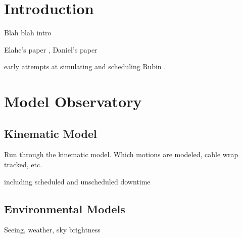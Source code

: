 \documentclass[]{aastex631}
\begin{document}

\section{Introduction} \label{sec:intro}
Blah blah intro

Elahe's paper \citet{Naghib2019}, Daniel's paper \citep{Rothchild2019}

early attempts at simulating and scheduling Rubin \citet{Delgado2014, Delgado2016SPIE}.


\section{Model Observatory}\label{sec:model_obs}

\subsection{Kinematic Model}

Run through the kinematic model. Which motions are modeled, cable wrap tracked, etc.

including scheduled and unscheduled downtime


\subsection{Environmental Models}
Seeing, weather, sky brightness
\end{document}
